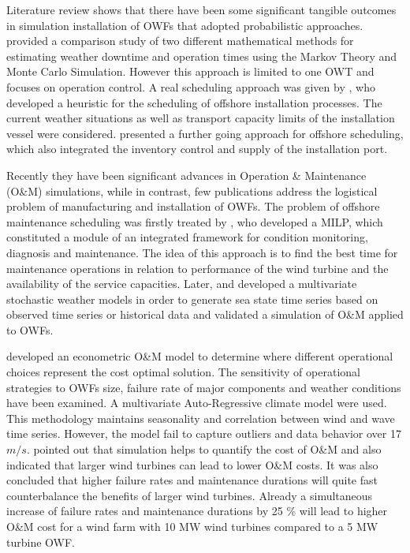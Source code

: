 Literature review shows that there have been some significant tangible outcomes in simulation installation of OWFs that adopted probabilistic approaches. \cite{Tyapin2011} provided a comparison study of two different mathematical methods for estimating weather downtime and operation times using the Markov Theory and Monte Carlo Simulation. However this approach is limited to one OWT and focuses on operation control. A real scheduling approach was given by \cite{Scholz2010}, who developed a heuristic for the scheduling of offshore installation processes. The current weather situations as well as transport capacity limits of the installation vessel were considered. \cite{ISOPE2012} presented a further going approach for offshore scheduling, which also integrated the inventory control and supply of the installation port.

Recently they have been significant advances in Operation \& Maintenance (O\&M) simulations, while in contrast, few publications address the logistical problem of manufacturing and installation of OWFs. The problem of offshore maintenance scheduling was firstly treated by \cite{Kovacs2011497}, who developed a MILP, which constituted a module of an integrated framework for condition monitoring, diagnosis and maintenance. The idea of this approach is to find the best time for maintenance operations in relation to performance of the wind turbine and the availability of the service capacities. Later, \cite{scheu2012} and \cite{Hagen2013} developed a multivariate stochastic weather models in order to generate sea state time series based on observed time series or historical data and validated a simulation of O\&M applied to OWFs.

\cite{dinwoodie2013} developed an econometric O\&M model to determine where different operational choices represent the cost optimal solution. The sensitivity of operational strategies to OWFs size, failure rate of major components and weather conditions have been examined. A multivariate Auto-Regressive climate model were used. This methodology maintains seasonality and correlation between wind and wave time series. However, the model fail to capture outliers and data behavior over 17 $m/s$. \cite{Hofmann2014} pointed out that simulation helps to quantify the cost of O\&M and also indicated that larger wind turbines can lead to lower O\&M costs. It was also concluded that higher failure rates and maintenance durations will quite fast counterbalance the benefits of larger wind turbines. Already a simultaneous increase of failure rates and maintenance durations by 25 \% will lead to higher O\&M cost for a wind farm with 10 MW wind turbines compared to a 5 MW turbine OWF. 
